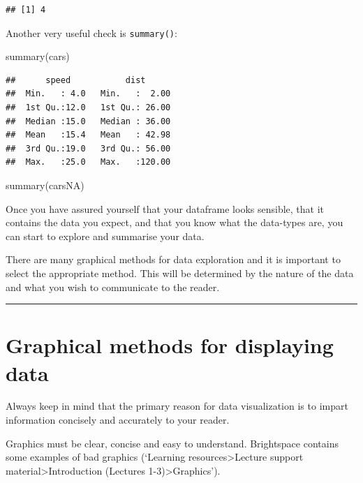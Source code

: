 \documentclass[
  11pt,
  a4paper,
]{book}
\newenvironment{Shaded}{\begin{snugshade}}{\end{snugshade}}
\newcommand{\FunctionTok}[1]{\textcolor[rgb]{0.00,0.00,0.00}{#1}}
\newcommand{\NormalTok}[1]{#1}
\begin{document}
\begin{verbatim}
## [1] 4
\end{verbatim}

Another very useful check is \texttt{summary()}:

\begin{Shaded}
\begin{Highlighting}[]
\FunctionTok{summary}\NormalTok{(cars)}
\end{Highlighting}
\end{Shaded}

\begin{verbatim}
##      speed           dist       
##  Min.   : 4.0   Min.   :  2.00  
##  1st Qu.:12.0   1st Qu.: 26.00  
##  Median :15.0   Median : 36.00  
##  Mean   :15.4   Mean   : 42.98  
##  3rd Qu.:19.0   3rd Qu.: 56.00  
##  Max.   :25.0   Max.   :120.00
\end{verbatim}

\begin{Shaded}
\begin{Highlighting}[]
\FunctionTok{summary}\NormalTok{(carsNA)}
\end{Highlighting}
\end{Shaded}

Once you have assured yourself that your dataframe looks sensible, that it contains the data you expect, and that you know what the data-types are, you can start to explore and summarise your data.

There are many graphical methods for data exploration and it is important to select the appropriate method. This will be determined by the nature of the data and what you wish to communicate to the reader.

\begin{center}\rule{0.5\linewidth}{0.5pt}\end{center}

\hypertarget{graphical-methods-for-displaying-data}{%
\section{Graphical methods for displaying data}\label{graphical-methods-for-displaying-data}}

Always keep in mind that the primary reason for data visualization is to impart information concisely and accurately to your reader.

Graphics must be clear, concise and easy to understand. Brightspace contains some examples of bad graphics (`Learning resources\textgreater Lecture support material\textgreater Introduction (Lectures 1-3)\textgreater Graphics').
\end{document}
